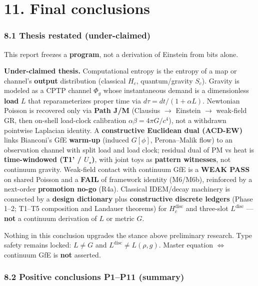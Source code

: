 \documentclass[
  11pt,
]{article}
\begin{document}
\section{11. Final conclusions}\label{final-conclusions}

\subsubsection{8.1 Thesis restated (under-claimed)}\label{thesis-restated-under-claimed}

This report freezes a \textbf{program}, not a derivation of Einstein from bits alone.

\textbf{Under-claimed thesis.} Computational entropy is the entropy of a map or channel's \textbf{output} distribution (classical \(H_c\), quantum/gravity \(S_c\)). Gravity is modeled as a CPTP channel \(\Phi_g\) whose instantaneous demand is a dimensionless \textbf{load} \(L\) that reparameterizes proper time via \(d\tau=dt/(1+\alpha L)\). Newtonian Poisson is recovered only via \textbf{Path J/M} (Clausius $\rightarrow$ Einstein $\rightarrow$ weak-field GR, then on-shell load-clock calibration \(\alpha\beta=4\pi G/c^4\)), not a withdrawn pointwise Laplacian identity. A \textbf{constructive Euclidean dual (ACD-EW)} links Bianconi's GfE \textbf{warm-up} (induced \(G[\phi]\), Perona--Malik flow) to an observation channel with split load and load clock; residual dual of PM vs heat is \textbf{time-windowed (T1' / \(U_\star\))}, with joint toys as \textbf{pattern witnesses}, not continuum gravity. Weak-field contact with continuum GfE is a \textbf{WEAK PASS} on shared Poisson and a \textbf{FAIL} of framework identity (M6/M6b), reinforced by a next-order \textbf{promotion no-go} (R4a). Classical IDEM/decay machinery is connected by a \textbf{design dictionary} plus \textbf{constructive discrete ledgers} (Phase 1--2; T1--T5 composition and Landauer theorems) for \(H_c^{\mathrm{disc}}\) and three-slot \(L^{\mathrm{disc}}\) --- \textbf{not} a continuum derivation of \(L\) or metric \(G\).

Nothing in this conclusion upgrades the stance above preliminary research. Type safety remains locked: \textbf{\(L\neq G\)} and \(L^{\mathrm{disc}}\neq L(\rho,g)\). Master equation \(\Leftrightarrow\) continuum GfE is \textbf{not} asserted.

\subsubsection{8.2 Positive conclusions P1--P11 (summary)}\label{positive-conclusions-p1p11-summary}
\end{document}
